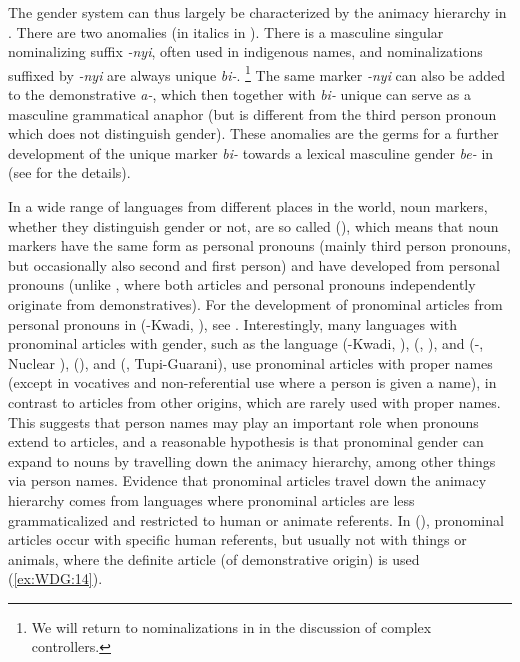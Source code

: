 \documentclass[output=collectionpaper]{langsci/langscibook}
\begin{document}
The  gender system can thus largely be characterized by the animacy hierarchy in . There are two anomalies (in italics in ). There is a masculine singular nominalizing suffix \textit{-nyi}, often used in indigenous names, and nominalizations suffixed by \textit{-nyi} are always unique \textit{bi-}.%
\footnote{%
We will return to  nominalizations in  in the discussion of complex controllers.
} %
The same marker \textit{-nyi} can also be added to the demonstrative \textit{a-}, which then together with \textit{bi-} unique can serve as a masculine grammatical anaphor (but is different from the third person pronoun which does not distinguish gender). These anomalies are the germs for a further development of the  unique marker \textit{bi-} towards a lexical masculine gender \textit{be-} in  (see \citealt{Waelchli2018} for the details).

In a wide range of languages from different places in the world, noun markers, whether they distinguish gender or not, are so called  (\citealt[838]{Himmelmann2001}), which means that noun markers have the same form as personal pronouns (mainly third person pronouns, but occasionally also second and first person) and have developed from personal pronouns (unlike , where both articles and personal pronouns independently originate from demonstratives). For the development of pronominal articles from personal pronouns in  (-Kwadi, ), see \cite[231--234]{Heine1984}. Interestingly, many languages with pronominal articles with gender, such as the  language  (-Kwadi, ),  (, ),  and  (-, Nuclear ),  (),  and  (, Tupi-Guarani), use pronominal articles with proper names (except in vocatives and non-referential use where a person is given a name), in contrast to articles from other origins, which are rarely used with proper names. This suggests that person names may play an important role when pronouns extend to articles, and a reasonable hypothesis is that pronominal gender can expand to nouns by travelling down the animacy hierarchy, among other things via person names. Evidence that pronominal articles travel down the animacy hierarchy comes from languages where pronominal articles are less grammaticalized and restricted to human or animate referents. In  (\citealt[178--184]{Loughnane2009}), pronominal articles occur with specific human referents, but usually not with things or animals, where the definite article (of demonstrative origin) is used (\ref{ex:WDG:14}).
\end{document}
